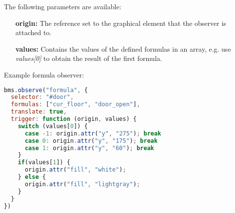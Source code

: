 \begin{itemize}
The following parameters are available:

\begin{itemize}
	\item[\textbf{origin:}] The reference set to the graphical element that the observer is attached to.
	\item[\textbf{values:}] Contains the values of the defined formulas in an array, e.g. use \textit{values[0]} to obtain the result of the first formula.
\end{itemize}
 
\end{itemize}

Example formula observer:

\begin{lstlisting}[language=JavaScript]
bms.observe("formula", {
  selector: "#door",
  formulas: ["cur_floor", "door_open"],
  translate: true,
  trigger: function (origin, values) {
    switch (values[0]) {
      case -1: origin.attr("y", "275"); break
      case 0: origin.attr("y", "175"); break
      case 1: origin.attr("y", "60"); break
    }
    if(values[1]) {
      origin.attr("fill", "white");
    } else {
      origin.attr("fill", "lightgray");
    }
  }
})
\end{lstlisting}


